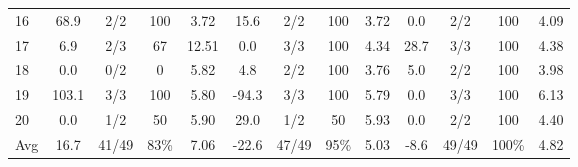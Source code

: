 \begin{table}[p]
{\begin{tabular}{l|cccc|cccc|cccc}
16 & 68.9 & 2/2 & 100 & 3.72 & 15.6 & 2/2 & 100 & 3.72 & 0.0 & 2/2 & 100 & 4.09 \\
17 & 6.9 & 2/3 & 67 & 12.51 & 0.0 & 3/3 & 100 & 4.34 & 28.7 & 3/3 & 100 & 4.38 \\
18 & 0.0 & 0/2 & 0 & 5.82 & 4.8 & 2/2 & 100 & 3.76 & 5.0 & 2/2 & 100 & 3.98 \\
19 & 103.1 & 3/3 & 100 & 5.80 & -94.3 & 3/3 & 100 & 5.79 & 0.0 & 3/3 & 100 & 6.13 \\
20 & 0.0 & 1/2 & 50 & 5.90 & 29.0 & 1/2 & 50 & 5.93 & 0.0 & 2/2 & 100 & 4.40 \\
\midrule
Avg & 16.7 & 41/49 & 83\% & 7.06 & -22.6 & 47/49 & 95\% & 5.03 & -8.6 & 49/49 & 100\% & 4.82 \\
\bottomrule
\end{tabular}%
}
\end{table}
